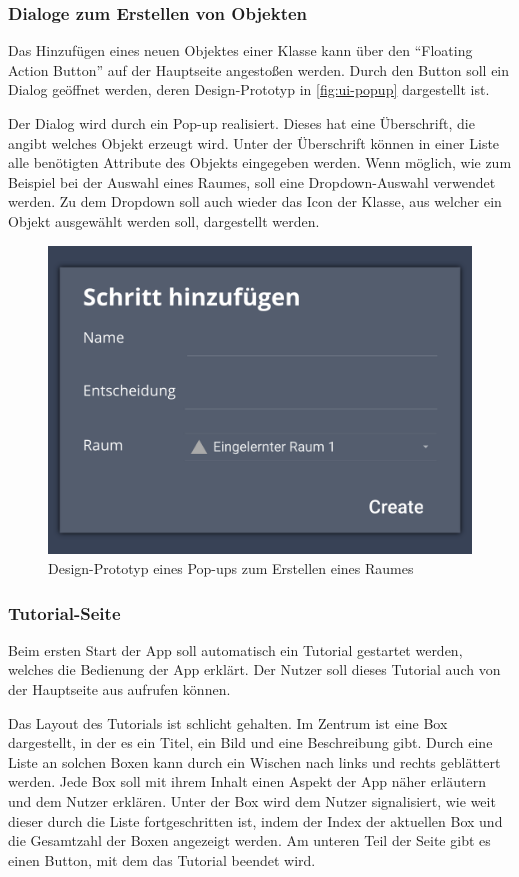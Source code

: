 \subsubsection{Dialoge zum Erstellen von Objekten} \label{sec:app-dialog}

Das Hinzufügen eines neuen Objektes einer Klasse kann über den \enquote{Floating Action Button} auf der Hauptseite angestoßen werden.
Durch den Button soll ein Dialog geöffnet werden, deren Design-Prototyp in \autoref{fig:ui-popup} dargestellt ist.

Der Dialog wird durch ein Pop-up realisiert.
Dieses hat eine Überschrift, die angibt welches Objekt erzeugt wird.
Unter der Überschrift können in einer Liste alle benötigten Attribute des Objekts eingegeben werden.
Wenn möglich, wie zum Beispiel bei der Auswahl eines Raumes, soll eine Dropdown-Auswahl verwendet werden.
Zu dem Dropdown soll auch wieder das Icon der Klasse, aus welcher ein Objekt ausgewählt werden soll, dargestellt werden.

\begin{figure}[h!tbp]
	\includegraphics[width=.5\textwidth]{images/ui-prototype/popup.png}
	\centering
	\caption{Design-Prototyp eines Pop-ups zum Erstellen eines Raumes}
	\label{fig:ui-popup}
\end{figure}

\subsubsection{Tutorial-Seite} \label{sec:app-tutorial}

Beim ersten Start der App soll automatisch ein Tutorial gestartet werden, welches die Bedienung der App erklärt.
Der Nutzer soll dieses Tutorial auch von der Hauptseite aus aufrufen können.

Das Layout des Tutorials ist schlicht gehalten.
Im Zentrum ist eine Box dargestellt, in der es ein Titel, ein Bild und eine Beschreibung gibt.
Durch eine Liste an solchen Boxen kann durch ein Wischen nach links und rechts geblättert werden.
Jede Box soll mit ihrem Inhalt einen Aspekt der App näher erläutern und dem Nutzer erklären.
Unter der Box wird dem Nutzer signalisiert, wie weit dieser durch die Liste fortgeschritten ist,
indem der Index der aktuellen Box und die Gesamtzahl der Boxen angezeigt werden.
Am unteren Teil der Seite gibt es einen Button, mit dem das Tutorial beendet wird.

